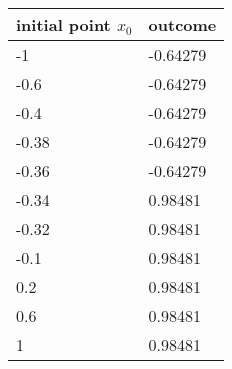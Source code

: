 \begin{tabular}{ll}
\hline
initial point $x_0$ & outcome \\ 
\hline 
-1 & -0.64279 \\ 
-0.6 & -0.64279 \\ 
-0.4 & -0.64279 \\ 
-0.38 & -0.64279 \\ 
-0.36 & -0.64279 \\ 
-0.34 & 0.98481 \\ 
-0.32 & 0.98481 \\ 
-0.1 & 0.98481 \\ 
0.2 & 0.98481 \\ 
0.6 & 0.98481 \\ 
1 & 0.98481 \\ 
\hline 
\end{tabular}